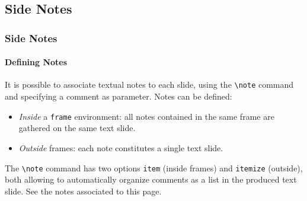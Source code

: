\documentclass[10pt,    %
    english,            %
    xcolor=table,       %
    envcountsect,        %
    aspectratio=169     %
]{beamer}
\begin{document}
\subsection{Side Notes}
\begin{frame}
    \frametitle{Side Notes}
    \framesubtitle{Defining Notes}
    
    It is possible to associate textual notes to each slide, using the \texttt{\textbackslash{}note} command and specifying a comment as parameter. Notes can be defined:
    \begin{itemize}
        \item \textit{Inside} a \texttt{frame} environment: all notes contained in the same frame are gathered on the same text slide.
        \item \textit{Outside} frames: each note constitutes a single text slide.
    \end{itemize}
    
    \vspace{0.25cm}
    The \texttt{\textbackslash{}note} command has two options \texttt{item} (inside frames) and \texttt{itemize} (outside), both allowing to automatically organize comments as a list in the produced text slide. See the notes associated to this page.
\end{frame}
\end{document}
